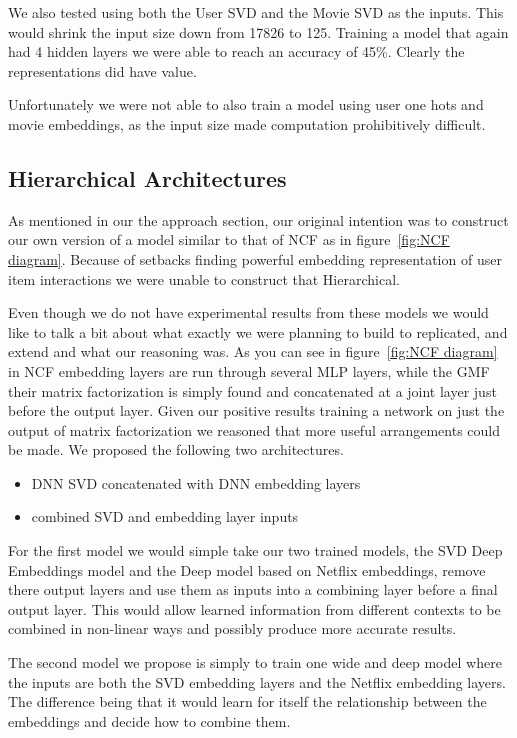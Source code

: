 We also tested using both the User SVD and the Movie SVD as the inputs. This would shrink the input size down from 17826 to 125. Training a model that again had 4 hidden layers we were able to reach an accuracy of 45\%. Clearly the representations did have value.

Unfortunately we were not able to also train a model using user one hots and movie embeddings, as the input size made computation prohibitively difficult. 



\subsection{Hierarchical Architectures}

As mentioned in our the approach section, our original intention was to construct our own version of a model similar to that of NCF as in figure~\ref{fig:NCF diagram}. Because of setbacks finding powerful embedding representation of user item interactions we were unable to construct that Hierarchical. 

Even though we do not have experimental results from these models we would like to talk a bit about what exactly we were planning to build to replicated, and extend \cite{He2017} and what our reasoning was. As you can see in figure~\ref{fig:NCF diagram} in NCF embedding layers are run through several MLP layers, while the GMF their matrix factorization is simply found and concatenated at a joint layer just before the output layer. Given our positive results training a network on just the output of matrix factorization we reasoned that more useful arrangements could be made. We proposed the following two architectures.

\begin{itemize}
\item DNN SVD concatenated with DNN embedding layers
\item combined SVD and embedding layer inputs
\end{itemize}

For the first model we would simple take our two trained models, the SVD Deep Embeddings model and the Deep model based on Netflix embeddings, remove there output layers and use them as inputs into a combining layer before a final output layer. This would allow learned information from different contexts to be combined in non-linear ways and possibly produce more accurate results.

The second model we propose is simply to train one wide and deep model where the inputs are both the SVD embedding layers and the Netflix embedding layers. The difference being that it would learn for itself the relationship between the embeddings and decide how to combine them.
